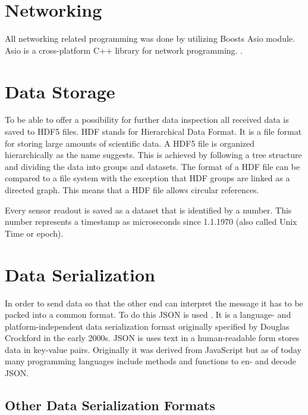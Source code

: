 \section{Networking}

All networking related programming was done by utilizing Boosts Asio module. Asio is a cross-platform C++ library for network programming. \autocite{BoostAsio}.

\section{Data Storage}

To be able to offer a possibility for further data inspection all received data is saved to HDF5 files. HDF stands for Hierarchical Data Format. It is a file format for storing large amounts of scientific data. A HDF5 file is organized hierarchically as the name suggests. This is achieved by following a tree structure and dividing the data into groups and datasets. The format of a HDF file can be compared to a file system with the exception that HDF groups are linked as a directed graph. This means that a HDF file allows circular references.

Every sensor readout is saved as a dataset that is identified by a number. This number represents a timestamp as microseconds since 1.1.1970 (also called Unix Time or epoch).

\section{Data Serialization}

%
%


In order to send data so that the other end can interpret the message it has to be packed into a common format. To do this JSON is used \autocite{rfc8259}. It is a language- and platform-independent data serialization format
originally specified by Douglas Crockford in the early 2000s. JSON is uses text in a human-readable form stores data in key-value pairs. Originally it was derived from JavaScript but as of today many programming languages
include methods and functions to en- and decode JSON.

\subsection{Other Data Serialization Formats}


